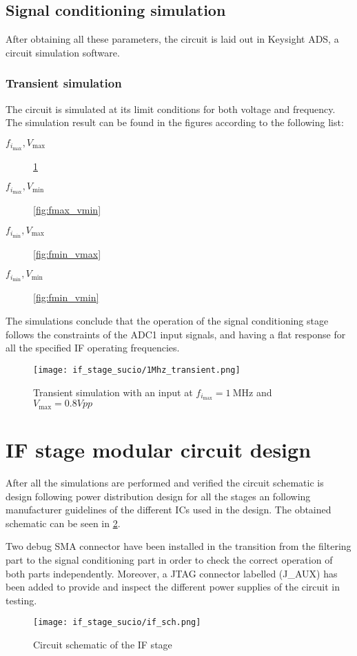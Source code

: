 \subsection{Signal conditioning simulation}

After obtaining all these parameters, the circuit is laid out in Keysight ADS, a circuit simulation software.

\subsubsection{Transient simulation}
The circuit is simulated at its limit conditions for both voltage and frequency. The simulation result can be found in the figures according to the following list:
\begin{description}
	\item [$f_{i_{\max}}, V_{\max}$] \cref{fig:fmax_vmax}
	\item [$f_{i_{\max}}, V_{\min}$] \cref{fig:fmax_vmin}
	\item [$f_{i_{\min}}, V_{\max}$] \cref{fig:fmin_vmax}
	\item [$f_{i_{\min}}, V_{\min}$] \cref{fig:fmin_vmin}
\end{description}


The simulations conclude that the operation of the signal conditioning stage follows the constraints of the ADC1 input signals, and having a flat response for all the specified IF operating frequencies.

\begin{figure}[h]
	\centering
	\texttt{[image: if\_stage\_sucio/1Mhz\_transient.png]}
	\caption{Transient simulation with an input at $f_{i_{\max}} = \SI{1}{\mega\hertz}$ and $V_{\max} = 0.8 Vpp$}
	\label{fig:fmax_vmax}
\end{figure}

\section{IF stage modular circuit design}
After all the simulations are performed and verified the circuit schematic is design following power distribution design for all the stages an following manufacturer guidelines of the different ICs used in the design. The obtained schematic can be seen in \cref{fig:if_sch}.

Two debug SMA connector have been installed in the transition from the filtering part to the signal conditioning part in order to check the correct operation of both parts independently. Moreover, a JTAG connector labelled (J\_AUX) has been added to provide and inspect the different power supplies of the circuit in testing.
\begin{figure}[h]
	\centering
	\texttt{[image: if\_stage\_sucio/if\_sch.png]}
	\caption{Circuit schematic of the IF stage}
	\label{fig:if_sch}
\end{figure}

